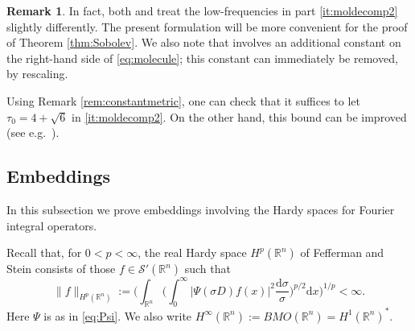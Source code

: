 \documentclass{amsart}
\newcommand {\BMO}{\mathrm{BMO}}
\newcommand {\ud}{\mathrm{d}}
\newcommand {\rb}{\rangle}
\newcommand {\lb}{\langle}
\newcommand {\R}{\mathbb R}
\newcommand {\Rn}{\mathbb{R}^{n}}
\newcommand {\Sw}{\mathcal{S}}
\theoremstyle{definition}
\newtheorem{remark}[theorem]{Remark}
\numberwithin{equation}{section}
\begin{document}
\begin{remark}\label{rem:moldecomp}
In fact, both \cite[Theorem 3.6]{Smith98a} and \cite[Theorem 8.3]{HaPoRo20} treat the low-frequencies in part \eqref{it:moldecomp2} slightly differently. The present formulation will be more convenient for the proof of Theorem \ref{thm:Sobolev}. We also note that \cite[Theorem 8.3]{HaPoRo20} involves an additional constant on the right-hand side of \eqref{eq:molecule}; this constant can immediately be removed, by rescaling.



Using Remark \ref{rem:constantmetric}, one can check that it suffices to let $\tau_{0}=4+\sqrt{6}$ in \eqref{it:moldecomp2}. On the other hand, this bound can be improved (see e.g.~\cite[Remark A.3]{CaMcMo13}).%
\end{remark}




\subsection{Embeddings}\label{subsec:Sobolev}

In this subsection we prove embeddings involving the Hardy spaces for Fourier integral operators.


Recall that, for $0<p<\infty$, the real Hardy space $H^{p}(\Rn)$ of Fefferman and Stein consists of those $f\in\Sw'(\Rn)$ such that
\begin{equation}\label{eq:Hp}
\|f\|_{H^{p}(\Rn)}:=\Big(\int_{\Rn}\Big(\int_{0}^{\infty}|\Psi(\sigma D)f(x)|^{2}\frac{\ud\sigma}{\sigma}\Big)^{p/2}\ud x\Big)^{1/p}<\infty.
\end{equation}
Here $\Psi$ is as in \eqref{eq:Psi}. We also write $H^{\infty}(\Rn):=BMO(\Rn)=H^{1}(\Rn)^{*}$. %
\end{document}
